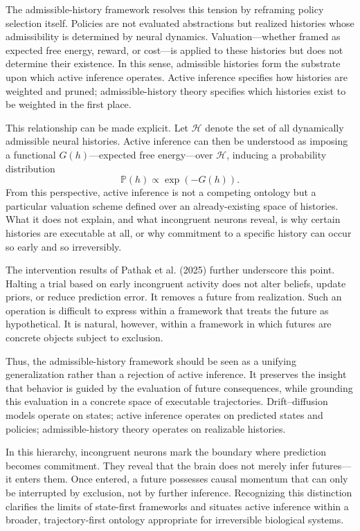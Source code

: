 \documentclass[11pt]{article}
\newcommand{\histories}{\mathcal{H}}
\newcommand{\prob}{\mathbb{P}}
\begin{document}
The admissible-history framework resolves this tension by reframing policy selection itself. Policies are not evaluated abstractions but realized histories whose admissibility is determined by neural dynamics. Valuation—whether framed as expected free energy, reward, or cost—is applied to these histories but does not determine their existence. In this sense, admissible histories form the substrate upon which active inference operates. Active inference specifies how histories are weighted and pruned; admissible-history theory specifies which histories exist to be weighted in the first place.

This relationship can be made explicit. Let $\histories$ denote the set of all dynamically admissible neural histories. Active inference can then be understood as imposing a functional $G(h)$—expected free energy—over $\histories$, inducing a probability distribution
\[
\prob(h) \propto \exp(-G(h)).
\]
From this perspective, active inference is not a competing ontology but a particular valuation scheme defined over an already-existing space of histories. What it does not explain, and what incongruent neurons reveal, is why certain histories are executable at all, or why commitment to a specific history can occur so early and so irreversibly.

The intervention results of Pathak et al. (2025) further underscore this point. Halting a trial based on early incongruent activity does not alter beliefs, update priors, or reduce prediction error. It removes a future from realization. Such an operation is difficult to express within a framework that treats the future as hypothetical. It is natural, however, within a framework in which futures are concrete objects subject to exclusion.

Thus, the admissible-history framework should be seen as a unifying generalization rather than a rejection of active inference. It preserves the insight that behavior is guided by the evaluation of future consequences, while grounding this evaluation in a concrete space of executable trajectories. Drift–diffusion models operate on states; active inference operates on predicted states and policies; admissible-history theory operates on realizable histories.

In this hierarchy, incongruent neurons mark the boundary where prediction becomes commitment. They reveal that the brain does not merely infer futures—it enters them. Once entered, a future possesses causal momentum that can only be interrupted by exclusion, not by further inference. Recognizing this distinction clarifies the limits of state-first frameworks and situates active inference within a broader, trajectory-first ontology appropriate for irreversible biological systems.
\end{document}
